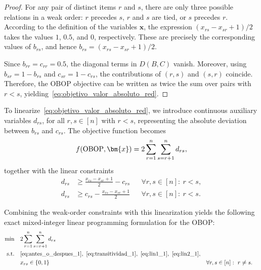 \documentclass[pdflatex,basic,Numbered]{jnl}%
\theoremstyle{plain}
\theoremstyle{remark}
\theoremstyle{thmstyleone}%
\theoremstyle{thmstylethree}%
\begin{document}
\begin{proof}
For any pair of distinct items \(r\) and \(s\), there are only three possible relations in a weak order: \(r\) precedes \(s\), \(r\) and \(s\) are tied, or \(s\) precedes \(r\). According to the definition of the variables \(\bm{x}\), the expression \((x_{rs}-x_{sr}+1)/2\) takes the values \(1\), \(0.5\), and \(0\), respectively. These are precisely the corresponding values of \(b_{rs}\), and hence \(b_{rs}=(x_{rs}-x_{sr}+1)/2\).

Since \(b_{rr}=c_{rr}=0.5\), the diagonal terms in \(D(B,C)\) vanish. Moreover, using \(b_{sr}=1-b_{rs}\) and \(c_{sr}=1-c_{rs}\), the contributions of \((r,s)\) and \((s,r)\) coincide. Therefore, the {\rm OBOP} objective can be written as twice the sum over pairs with \(r<s\), yielding~\eqref{eq:objetivo_valor_absoluto_red}.
\end{proof}

To linearize~\eqref{eq:objetivo_valor_absoluto_red}, we introduce continuous auxiliary variables \(d_{rs}\), for all \(r,s\in[n]\) with \(r<s\), representing the absolute deviation between \(b_{rs}\) and \(c_{rs}\). The objective function becomes
\begin{equation}\label{eq:objetivo_linealizado}
f({\rm OBOP},\bm{x})=
2\sum_{r=1}^{n}\sum_{s=r+1}^{n} d_{rs},
\end{equation}
together with the linear constraints
\begin{subequations}\label{eq:linearizacion_OBOP}
    \begin{align}
        d_{rs} &\ge 
        \frac{x_{rs}-x_{sr}+1}{2}-c_{rs}
        && \forall r,s\in[n]:\ r<s, \label{eq:lin1_1} \\
        d_{rs} &\ge 
        c_{rs}-\frac{x_{rs}-x_{sr}+1}{2}
        && \forall r,s\in[n]:\ r<s. \label{eq:lin2_1}
    \end{align}
\end{subequations}

Combining the weak-order constraints with this linearization yields the following exact mixed-integer linear programming formulation for the OBOP:
\begin{subequations}\label{mod:OBOP}
    \begin{align} 
    \min\quad 
        & 2\sum_{r=1}^{n}\sum_{s=r+1}^{n} d_{rs} \label{eq:obj_OBOP} \\
    \text{s.t.}\quad
        & \eqref{eq:antes_o_despues_1},\ \eqref{eq:transitividad_1},\ \eqref{eq:lin1_1},\ \eqref{eq:lin2_1}, \\
        & x_{rs}\in\{0,1\}
        && \forall r,s\in [n]:\ r\neq s. \label{eq:naturaleza_x_OBOP}
    \end{align}
\end{subequations}
\end{document}
